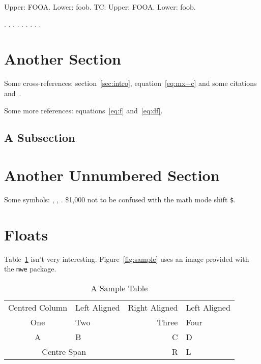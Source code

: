 \documentclass{article}
\begin{document}
\newcommand{\foo}{fooa}
\newcommand{\FOO}{foob}
Upper: \uppercase{\foo}. Lower: \lowercase{\FOO}.
TC: Upper: \MakeTextUppercase{\foo}. Lower:
\MakeTextLowercase{\FOO}.

.
.
.
.
.
.
.
.
.

\section{Another Section}

Some cross-references: section~\ref{sec:intro},
equation~\ref{eq:mx+c} and some
citations~\cite{article-full,incollection-full}
and~\cite[some text]{inproceedings-full}.

Some more references: equations~\ref{eq:f} and~\ref{eq:df}.

\lipsum[2-3]

\subsection{A Subsection}

\lipsum[6-7]

\section*{Another Unnumbered Section}

Some symbols: , , . \$1,000 not to be
confused with the math mode shift \verb|$|.

\lipsum[8-9]

\section{Floats}
\label{sec:floats}

Table~\ref{tab:sample} isn't very interesting.
Figure~\ref{fig:sample} uses an image provided with the 
\texttt{mwe} package.

\begin{table}[htbp]
\caption{A Sample Table}
\label{tab:sample}
\centering
\begin{tabular}{clrl}
Centred Column & Left Aligned & Right Aligned & Left Aligned\\
One & Two & Three & Four\\
A & B & C & D\\
\multicolumn{2}{|c|}{Centre Span} & R & L
\end{tabular}
\end{table}
\end{document}
